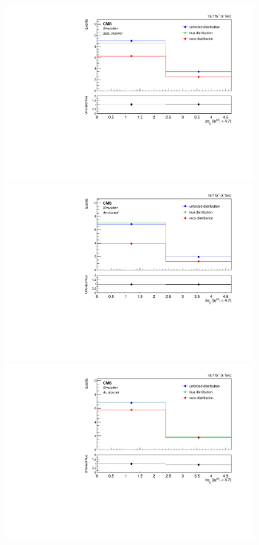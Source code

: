 \begin{figure}[hbtp]
\begin{center}
    \includegraphics[width=0.8\cmsFigWidth]{Figures/Unfolding/MCTests/Deta_ZZTo2e2m_MadMatrix_PowDistr_FullSample_fr}
     \includegraphics[width=0.8\cmsFigWidth]{Figures/Unfolding/MCTests/Deta_ZZTo4e_PowMatrix_MadDistr_FullSample_fr}     
    \includegraphics[width=0.8\cmsFigWidth]{Figures/Unfolding/MCTests/Deta_ZZTo4m_PowMatrix_MadDistr_FullSample_fr}     

\end{center}
\end{figure}
